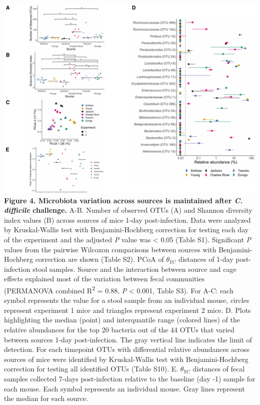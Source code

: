 \documentclass[
  11pt,
]{article}
\begin{document}
\newpage

\includegraphics{figure_4.pdf} \textbf{Figure 4. Microbiota variation
across sources is maintained after \emph{C. difficile} challenge.} A-B.
Number of observed OTUs (A) and Shannon diversity index values (B)
across sources of mice 1-day post-infection. Data were analyzed by
Kruskal-Wallis test with Benjamini-Hochberg correction for testing each
day of the experiment and the adjusted \emph{P} value was \textless{}
0.05 (Table S1). Significant \emph{P} values from the pairwise Wilcoxon
comparisons between sources with Benjamini-Hochberg correction are shown
(Table S2). PCoA of \(\theta_{YC}\) distances of 1-day post-infection
stool samples. Source and the interaction between source and cage
effects explained most of the variation between fecal communities
(PERMANOVA combined R\textsuperscript{2} = 0.88, \emph{P} \textless{}
0.001, Table S3). For A-C: each symbol represents the value for a stool
sample from an individual mouse, circles represent experiment 1 mice and
triangles represent experiment 2 mice. D. Plots highlighting the median
(point) and interquantile range (colored lines) of the relative
abundances for the top 20 bacteria out of the 44 OTUs that varied
between sources 1-day post-infection. The gray vertical line indicates
the limit of detection. For each timepoint OTUs with differential
relative abundances across sources of mice were identified by
Kruskal-Wallis test with Benjamini-Hochberg correction for testing all
identified OTUs (Table S10). E. \(\theta_{YC}\) distances of fecal
samples collected 7-days post-infection relative to the baseline (day
-1) sample for each mouse. Each symbol represents an individual mouse.
Gray lines represent the median for each source.
\end{document}

